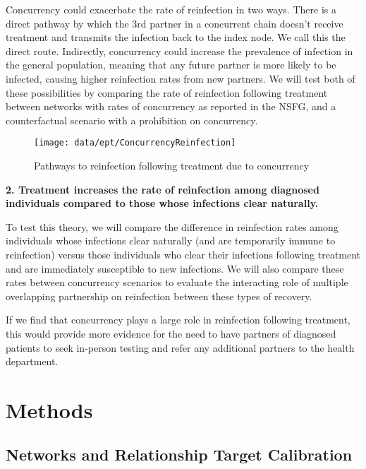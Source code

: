 \documentclass [11pt, proquest] {uwthesis}[2015/03/03]
\begin{document}
Concurrency could exacerbate the rate of reinfection in two ways. There is a direct pathway by which the 3rd partner in a concurrent chain doesn't receive treatment and transmits the infection back to the index node. We call this the direct route. Indirectly, concurrency could increase the prevalence of infection in the general population, meaning that any future partner is more likely to be infected, causing higher reinfection rates from new partners. We will test both of these possibilities by comparing the rate of reinfection following treatment between networks with rates of concurrency as reported in the NSFG, and a counterfactual scenario with a prohibition on concurrency.
\begin{figure}

{\centering \texttt{[image: data/ept/ConcurrencyReinfection]} 

}

\caption{Pathways to reinfection following treatment due to concurrency}\label{fig:reinf-diag}
\end{figure}
\textbf{2. Treatment increases the rate of reinfection among diagnosed individuals compared to those whose infections clear naturally.}

To test this theory, we will compare the difference in reinfection rates among individuals whose infections clear naturally (and are temporarily immune to reinfection) versus those individuals who clear their infections following treatment and are immediately susceptible to new infections. We will also compare these rates between concurrency scenarios to evaluate the interacting role of multiple overlapping partnership on reinfection between these types of recovery.

If we find that concurrency plays a large role in reinfection following treatment, this would provide more evidence for the need to have partners of diagnosed patients to seek in-person testing and refer any additional partners to the health department.

\hypertarget{methods-1}{%
\section{Methods}\label{methods-1}}

\hypertarget{networks-and-relationship-target-calibration}{%
\subsection{Networks and Relationship Target Calibration}\label{networks-and-relationship-target-calibration}}
\end{document}

